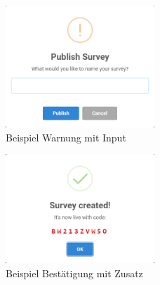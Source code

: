 \begin{figure}[H]
	\centering
	\includegraphics[width=0.5\textwidth, keepaspectratio]{img/guide/Publish.png}
	\captionsetup{justification=centering, format=plain}
	\caption[Beispiel Warnung mit Input]{Beispiel Warnung mit Input \\\quelleScreenshot}
	\label{fig:warn}
\end{figure}

\begin{figure}[H]
	\centering
	\includegraphics[width=0.5\textwidth, keepaspectratio]{img/guide/Published.png}
	\captionsetup{justification=centering, format=plain}
	\caption[Beispiel Bestätigung mit Zusatz]{Beispiel Bestätigung mit Zusatz \\\quelleScreenshot}
	\label{fig:special}
\end{figure}



